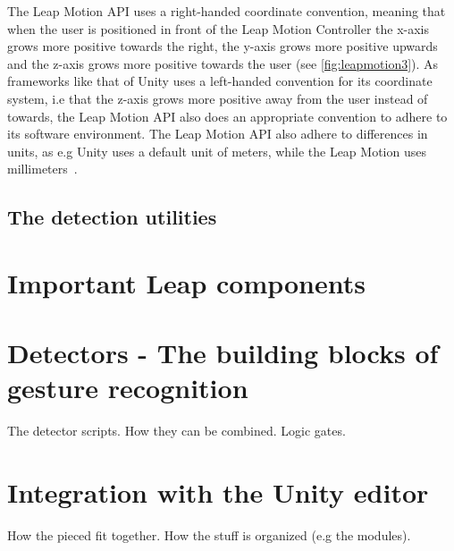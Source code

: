 The Leap Motion API uses a right-handed coordinate convention, meaning that when the user is positioned in front of the Leap Motion Controller the x-axis grows more positive 
towards the right, the y-axis grows more positive upwards and the z-axis grows more positive towards the user (see \ref{fig:leapmotion3}). 
As frameworks like that of Unity uses a left-handed convention for its coordinate system, i.e that the z-axis grows more positive away from the 
user instead of towards, the Leap Motion API also does an appropriate convention to adhere to its software environment. 
The Leap Motion API also adhere to differences in units, as e.g Unity uses a default unit of meters, while the Leap Motion uses millimeters~\citep{LeapMotion2016}.


\subsection{The detection utilities}



\section{Important Leap components}






\section{Detectors - The building blocks of gesture recognition}
The detector scripts. How they can be combined. Logic gates. 

\section{Integration with the Unity editor}
How the pieced fit together. How the stuff is organized (e.g the modules).
